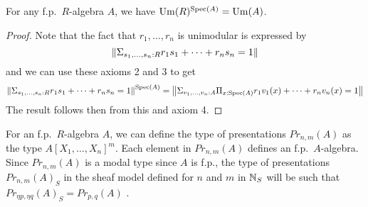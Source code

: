     \begin{lemma}\label{Um}
      For any f.p.\ $R$-algebra $A$, we have $\mathrm{Um}(R)^{\operatorname{Spec}(A)} = \mathrm{Um}(A)$.
    \end{lemma}

    \begin{proof}
      Note that the fact that $r_1,\dots,r_n$ is unimodular is expressed by
      $$\left\lVert \Sigma_{s_1,\dots,s_n:R}r_1s_1+\dots+r_ns_n = 1 \right\rVert$$
      and we can use these axioms 2 and 3 to get
      $$\left\lVert \Sigma_{s_1,\dots,s_n:R}r_1s_1+\dots+r_ns_n = 1 \right\rVert^{\operatorname{Spec}(A)} = \left\lVert \Sigma_{v_1,\dots,v_n:A}\Pi_{x:\operatorname{Spec}(A)}r_1v_1(x)+\dots+r_nv_n(x) = 1 \right\rVert$$
      The result follows then from this and axiom 4.
    \end{proof}      





    
    For an f.p.\ $R$-algebra $A$, we can define the type of presentations $Pr_{n,m}(A)$ as the type $A[X_1,\dots,X_n]^m$.
    Each element in $Pr_{n,m}(A)$ defines an
    f.p.\ $A$-algebra. Since $Pr_{n,m}(A)$ is a modal type since $A$ is f.p., the type of presentations $Pr_{n,m}(A)_S$ in the sheaf model
    defined for $n$ and $m$ in $\mathbb{N}_S$ will be such that $Pr_{\eta p,\eta q}(A)_S = Pr_{p,q}(A)$ \cite{CRS21}.
    

